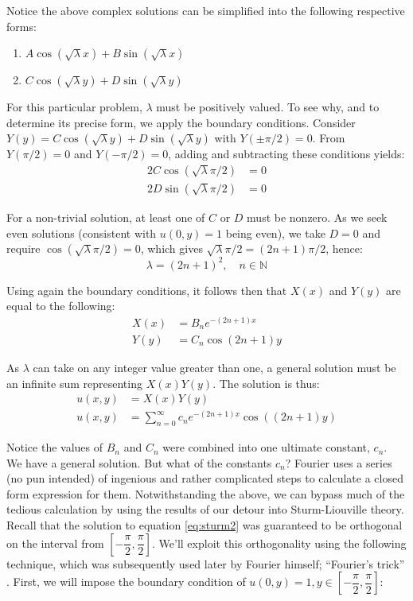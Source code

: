 \documentclass[12pt,a4paper]{report}
\theoremstyle{thms}
\theoremstyle{defns}
\begin{document}
Notice the above complex solutions can be simplified into the following respective forms:
\begin{enumerate}
    \item $A\cos(\sqrt{\lambda}x) + B\sin(\sqrt{\lambda}x)$
    \item $C\cos(\sqrt{\lambda}y) + D\sin(\sqrt{\lambda}y)$
\end{enumerate}

For this particular problem, $\lambda$ must be positively valued. To see why, and to determine its precise form, we apply the boundary conditions. Consider $Y(y) = C\cos(\sqrt{\lambda}y) + D\sin(\sqrt{\lambda}y)$ with $Y(\pm\pi/2) = 0$. From $Y(\pi/2) = 0$ and $Y(-\pi/2) = 0$, adding and subtracting these conditions yields:
\begin{align}
    2C\cos(\sqrt{\lambda}\pi/2) & = 0 \\
    2D\sin(\sqrt{\lambda}\pi/2) & = 0
\end{align}

For a non-trivial solution, at least one of $C$ or $D$ must be nonzero. As we seek even solutions (consistent with $u(0, y) = 1$ being even), we take $D = 0$ and require $\cos(\sqrt{\lambda}\pi/2) = 0$, which gives $\sqrt{\lambda}\pi/2 = (2n+1)\pi/2$, hence:
\begin{equation}
    \lambda = (2n + 1)^2, \quad n \in \mathbb{N}
\end{equation}

Using again the boundary conditions, it follows then that $X(x)$ and $Y(y)$ are equal to the following:
\begin{align}
    X(x) & = B_ne^{-(2n+1)x}                 \\
    Y(y) & = C_n\cos{(2n+1)y}\label{eq:yofy}
\end{align}

As $\lambda$ can take on any integer value greater than one, a general solution must be an infinite sum representing $X(x)Y(y)$. The solution is thus:
\begin{align}
    u(x, y) & = X(x)Y(y)                                         \\
    u(x, y) & = \sum_{n=0}^{\infty} c_ne^{-(2n+1)x}\cos((2n+1)y)
\end{align}

Notice the values of $B_n$ and $C_n$ were combined into one ultimate constant, $c_n$.\\
We have a general solution. But what of the constants $c_n$? Fourier uses a series (no pun intended) of ingenious and rather complicated steps to calculate a closed form expression for them. Notwithstanding the above, we can bypass much of the tedious calculation by using the results of our detour into Sturm-Liouville theory. Recall that the solution to equation \eqref{eq:sturm2} was guaranteed to be orthogonal on the interval from $[-\dfrac{\pi}{2}, \dfrac{\pi}{2}]$. We'll exploit this orthogonality using the following technique, which was subsequently used later by Fourier himself; ``Fourier's trick'' \cite{heat_fourier}. First, we will impose the boundary condition of $u(0, y) = 1, y \in [-\dfrac{\pi}{2}, \dfrac{\pi}{2}]$:
\end{document}
